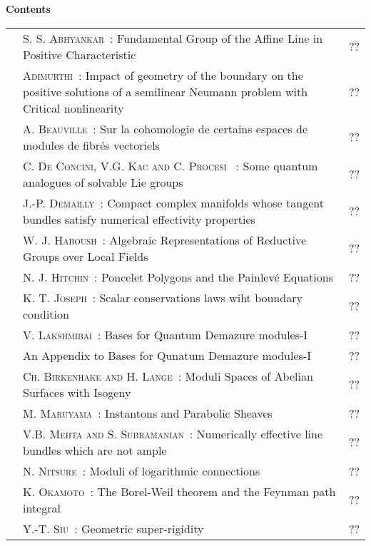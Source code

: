 \thispagestyle{empty}

\noindent
{\bf\huge Contents}

\vskip 1cm

\thispagestyle{empty}

\noindent
\renewcommand{\arraystretch}{1.7}
\begin{longtable}[l]{r>{\raggedright}p{9cm}r}
   &  \textsc{S. S. Abhyankar~:} Fundamental Group of the Affine Line in Positive Characteristic  & ?? \\
   & \textsc{Adimurthi~:} Impact of geometry of the boundary on the positive solutions of a semilinear Neumann problem with Critical nonlinearity  & ??\\
   & \textsc{A. Beauville~:} Sur la cohomologie de certains espaces de modules de fibr\'es vectoriels & ??\\
   & \textsc{C. De Concini, V.G. Kac and C. Procesi ~:} Some quantum analogues of solvable Lie groups & ??\\
   & \textsc{J.-P. Demailly~:} Compact complex manifolds whose tangent bundles satisfy numerical effectivity properties & ??\\
   & \textsc{W. J. Haboush~:} Algebraic Representations of Reductive Groups over Local Fields  & ??\\
   & \textsc{N. J. Hitchin~:} Poncelet Polygons and the Painlev\'e Equations & ??\\
   & \textsc{K. T. Joseph~:} Scalar conservations laws wiht boundary condition  & ??\\
   & \textsc{V. Lakshmibai~:} Bases for Quantum Demazure modules-I  & ??\\
   &  An Appendix to Bases for Qunatum Demazure modules-I  & ??\\
   & \textsc{Ch. Birkenhake and H. Lange~:} Moduli Spaces of Abelian Surfaces with Isogeny & ??\\
   & \textsc{M. Maruyama~:} Instantons and Parabolic Sheaves  & ??\\
   & \textsc{V.B. Mehta and S. Subramanian~:} Numerically effective line bundles which are not ample   & ??\\
   & \textsc{N. Nitsure~:} Moduli of logarithmic connections & ??\\
   & \textsc{K. Okamoto~:} The Borel-Weil theorem and the Feynman path integral & ??\\
   & \textsc{Y.-T. Siu~:} Geometric super-rigidity & ??
\end{longtable}
\thispagestyle{empty}
